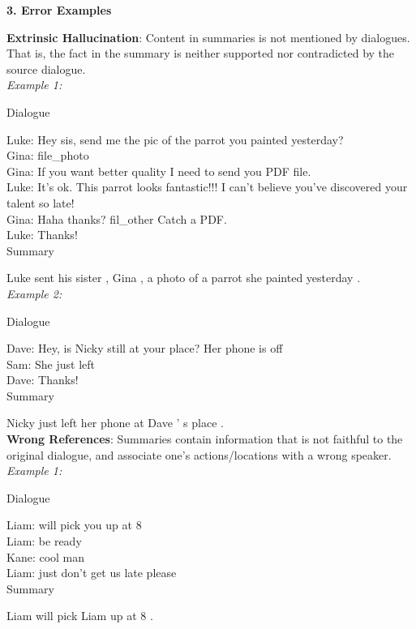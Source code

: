 \textbf{3. Error Examples}

\textbf{Extrinsic Hallucination}: Content in summaries is not mentioned by dialogues. That is, the fact in the summary is neither supported nor contradicted by the source dialogue.\\

\textit{Example 1:}

Dialogue

 Luke: Hey sis, send me the pic of the parrot you painted yesterday?\\
 Gina: file\_photo\\
 Gina: If you want better quality I need to send you PDF file.\\
 Luke: It's ok. This parrot looks fantastic!!! I can't believe you've discovered your talent so late!\\
 Gina: Haha thanks? fil\_other Catch a PDF.\\
 Luke: Thanks!\\

Summary

Luke sent his sister , Gina , a photo of a parrot she painted yesterday .\\


\textit{Example 2:}

Dialogue

 Dave: Hey, is Nicky still at your place? Her phone is off\\
 Sam: She just left\\
 Dave: Thanks!\\
 
Summary

Nicky just left her phone at Dave ' s place .\\

\textbf{Wrong References}: Summaries contain information that is not faithful to
the original dialogue, and associate one’s actions/locations with a wrong speaker.\\

\textit{Example 1:}

Dialogue

Liam: will pick you up at 8\\
Liam: be ready\\
Kane: cool man\\
Liam: just don't get us late please\\

Summary

Liam will pick Liam up at 8 .\\

